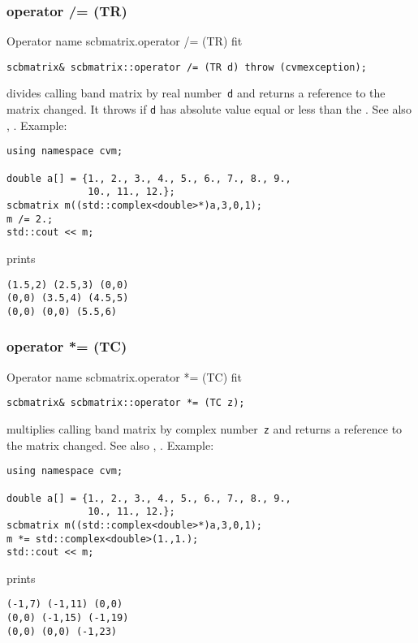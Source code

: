 \subsubsection{operator /= (TR)}
Operator%
\pdfdest name {scbmatrix.operator /= (TR)} fit
\begin{verbatim}
scbmatrix& scbmatrix::operator /= (TR d) throw (cvmexception);
\end{verbatim}
divides  calling band matrix by  real number~\verb"d"
and returns a reference to
the matrix changed.
It throws  
if \verb"d" has  absolute value equal or less
than the 
.
See also ,
.
Example:
\begin{Verbatim}
using namespace cvm;

double a[] = {1., 2., 3., 4., 5., 6., 7., 8., 9.,
              10., 11., 12.};
scbmatrix m((std::complex<double>*)a,3,0,1);
m /= 2.;
std::cout << m;
\end{Verbatim}
prints
\begin{Verbatim}
(1.5,2) (2.5,3) (0,0)
(0,0) (3.5,4) (4.5,5)
(0,0) (0,0) (5.5,6)
\end{Verbatim}
\newpage




\subsubsection{operator *= (TC)}
Operator%
\pdfdest name {scbmatrix.operator *= (TC)} fit
\begin{verbatim}
scbmatrix& scbmatrix::operator *= (TC z);
\end{verbatim}
multiplies  calling band matrix by  complex number~\verb"z"
and returns a reference to
the matrix changed.
See also ,
.
Example:
\begin{Verbatim}
using namespace cvm;

double a[] = {1., 2., 3., 4., 5., 6., 7., 8., 9.,
              10., 11., 12.};
scbmatrix m((std::complex<double>*)a,3,0,1);
m *= std::complex<double>(1.,1.);
std::cout << m;
\end{Verbatim}
prints
\begin{Verbatim}
(-1,7) (-1,11) (0,0)
(0,0) (-1,15) (-1,19)
(0,0) (0,0) (-1,23)
\end{Verbatim}
\newpage



